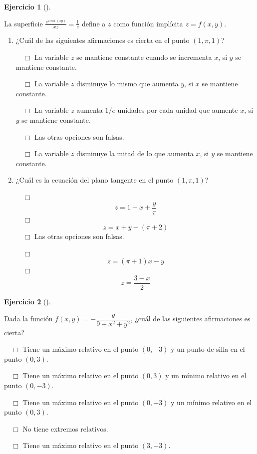 \documentclass[
  a4paper,
]{scrreport}
\theoremstyle{definition}
\newtheorem{exercise}{Ejercicio}[chapter]
\theoremstyle{remark}
\begin{document}
\begin{exercise}[]\protect\hypertarget{exr-derivadas-funciones-varias-variables-propuesto-4}{}\label{exr-derivadas-funciones-varias-variables-propuesto-4}

La superficie \(\frac{e^{z\cos(xy)}}{xz}=\frac{1}{e}\) define a \(z\)
como función implícita \(z=f(x,y)\).

\begin{enumerate}
\def\labelenumi{\alph{enumi}.}
\item
  ¿Cuál de las siguientes afirmaciones es cierta en el punto
  \((1,\pi,1)\)?

  ${\quad\Box}$ La variable $z$ se mantiene constante cuando se incrementa $x$, si $y$ se mantiene constante.

  ${\quad\Box}$ La variable $z$ disminuye lo mismo que aumenta $y$, si $x$ se mantiene constante.

  ${\quad\Box}$ La variable $z$ aumenta $1/e$ unidades por cada unidad que aumente $x$, si $y$ se mantiene constante.

  ${\quad\Box}$ Las otras opciones son falsas.

  ${\quad\Box}$ La variable $z$ disminuye la mitad de lo que aumenta $x$, si $y$ se mantiene constante.
\item
  ¿Cuál es la ecuación del plano tangente en el punto \((1,\pi,1)\)?

  ${\quad\Box}$ $$z=1-x+\frac{y}{\pi}$$
  ${\quad\Box}$ $$z=x+y-(\pi+2)$$
  ${\quad\Box}$ Las otras opciones son falsas.

  ${\quad\Box}$ $$z=(\pi+1)x-y$$
  ${\quad\Box}$ $$z=\frac{3-x}{2}$$
\end{enumerate}

\end{exercise}

\begin{exercise}[]\protect\hypertarget{exr-derivadas-funciones-varias-variables-propuesto-5}{}\label{exr-derivadas-funciones-varias-variables-propuesto-5}

Dada la función \(f(x,y)=-\dfrac{y}{9+x^2+y^2}\), ¿cuál de las
siguientes afirmaciones es cierta?

${\quad\Box}$ Tiene un máximo relativo en el punto $(0,-3)$ y un punto de silla en el punto $(0,3)$.

${\quad\Box}$ Tiene un máximo relativo en el punto $(0,3)$ y un mínimo relativo en el punto $(0,-3)$.

${\quad\Box}$ Tiene un máximo relativo en el punto $(0,-3)$ y un mínimo relativo en el punto $(0,3)$.

${\quad\Box}$ No tiene extremos relativos.

${\quad\Box}$ Tiene un máximo relativo en el punto $(3,-3)$.

\end{exercise}
\end{document}
